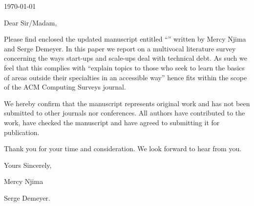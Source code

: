 
\begin{flushright}
\today
\end{flushright}

\vspace{1em}
\noindent
Dear Sir/Madam,

\vspace{1em}

Please find enclosed the updated manuscript entitled ``\paperTitle'' written by Mercy Njima and Serge Demeyer.
In this paper we report on a multivocal literature survey concerning the ways start-ups and scale-ups deal with technical debt.
As such we feel that this complies with ``explain topics to those who seek to learn the basics of areas outside their specialties in an accessible way'' hence fits within the scope of the ACM Computing Surveys journal.

We hereby confirm that the manuscript represents original work and has not been submitted to other journals nor conferences.
All authors have contributed to the work, have checked the manuscript and have agreed to submitting it for publication.


\vspace{1em}
\noindent
Thank you for your time and consideration.
We look forward to hear from you.


\vspace{2em}
\noindent
Yours Sincerely,

\vspace{1em}

\noindent
Mercy Njima

\noindent
Serge Demeyer.